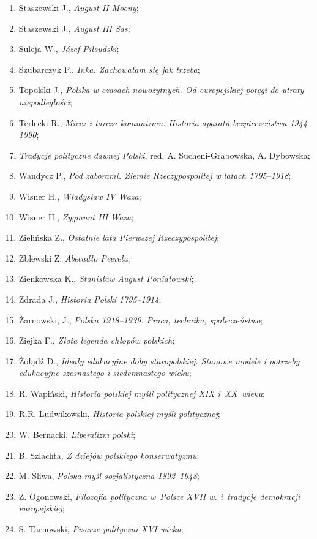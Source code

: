 \documentclass[a4paper,11pt]{article}
\begin{document}
\begin{enumerate}
\item Staszewski J., \emph{August II Mocny};
\item Staszewski J., \emph{August III Sas};
\item Suleja W., \emph{Józef Piłsudski};
\item Szubarczyk P., \emph{Inka. Zachowałam się jak trzeba\ld};
\item Topolski J., \emph{Polska w czasach nowożytnych. Od europejskiej
    potęgi do utraty niepodległości};
\item Terlecki R., \emph{Miecz i tarcza komunizmu. Historia aparatu
    bezpieczeństwa 1944--1990};
\item \emph{Tradycje polityczne dawnej Polski}, red. A.
  Sucheni-Grabowska, A. Dybowska;
\item Wandycz P., \emph{Pod zaborami. Ziemie Rzeczypospolitej w latach
    1795--1918};
\item Wisner H., \emph{Władysław IV Waza};
\item Wisner H., \emph{Zygmunt III Waza};
\item Zielińska Z., \emph{Ostatnie lata Pierwszej Rzeczypospolitej};
\item Zblewski Z, \emph{Abecadło Peerelu};
\item Zienkowska K., \emph{Stanisław August Poniatowski};
\item Zdrada J., \emph{Historia Polski 1795--1914};
\item Żarnowski, J., \emph{Polska 1918--1939. Praca, technika,
    społeczeństwo};
\item Ziejka F., \emph{Złota legenda chłopów polskich};
\item Żołądź D., \emph{Ideały edukacyjne doby staropolskiej. Stanowe
    modele i potrzeby edukacyjne szesnastego i siedemnastego wieku};
\item R. Wapiński, \emph{Historia polskiej myśli politycznej XIX
    i~XX~wieku};
\item R.R. Ludwikowski, \emph{Historia polskiej myśli politycznej};
\item W. Bernacki, \emph{Liberalizm polski};
\item B. Szlachta, \emph{Z dziejów polskiego konserwatyzmu};
\item M. Śliwa, \emph{Polska myśl socjalistyczna 1892--1948};
\item Z. Ogonowski, \emph{Filozofia polityczna w~Polsce XVII w.
    i~tradycje demokracji europejskiej};
\item S. Tarnowski, \emph{Pisarze polityczni XVI wieku};

\end{enumerate}
\end{document}
